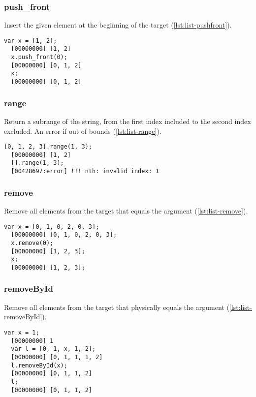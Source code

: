 \subsubsection{push\_front}

Insert the given element at the beginning of the target
(\autoref{lst:list-pushfront}).

\begin{lstlisting}[caption=List.push\_front, label=lst:list-pushfront, float=\floatposh]
  var x = [1, 2];
  [00000000] [1, 2]
  x.push_front(0);
  [00000000] [0, 1, 2]
  x;
  [00000000] [0, 1, 2]
\end{lstlisting}

\subsubsection{range}

Return a subrange of the string, from the first index included to the
second index excluded. An error if out of bounds (\autoref{lst:list-range}).

\begin{lstlisting}[caption=List.range, label=lst:list-range, float=\floatposh]
  [0, 1, 2, 3].range(1, 3);
  [00000000] [1, 2]
  [].range(1, 3);
  [00428697:error] !!! nth: invalid index: 1
\end{lstlisting}


\subsubsection{remove}

Remove all elements from the target that equals the argument
(\autoref{lst:list-remove}).

\begin{lstlisting}[caption=List.remove, label=lst:list-remove, float=\floatposh]
  var x = [0, 1, 0, 2, 0, 3];
  [00000000] [0, 1, 0, 2, 0, 3];
  x.remove(0);
  [00000000] [1, 2, 3];
  x;
  [00000000] [1, 2, 3];
\end{lstlisting}

\subsubsection{removeById}

Remove all elements from the target that physically equals the
argument (\autoref{lst:list-removeById}).

\begin{lstlisting}[caption=List.removeById, label=lst:list-removeById,
  float=\floatposh]
  var x = 1;
  [00000000] 1
  var l = [0, 1, x, 1, 2];
  [00000000] [0, 1, 1, 1, 2]
  l.removeById(x);
  [00000000] [0, 1, 1, 2]
  l;
  [00000000] [0, 1, 1, 2]
\end{lstlisting}

